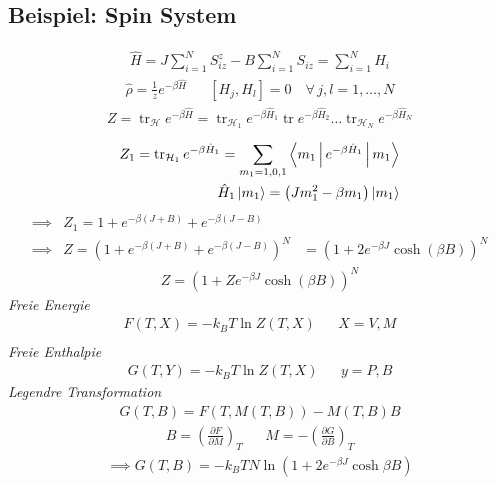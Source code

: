 \documentclass[11pt]{article}
\theoremstyle{plain}
\theoremstyle{mytheoremstyle}
\newcommand{\pd}[2]{\frac{\partial #1 }{\partial #2}}
\newcommand{\trace}{\operatorname{tr}}
\begin{document}
\subsection*{Beispiel: Spin System}
%
\begin{align*}
  \hat{H} = J \sum_{i=1}^{N} S_{iz}^z - B \sum_{i=1}^{N} S_{iz} 
  = \sum_{i=1}^{N} H_i
\end{align*}
%
%
\begin{align*}
  \hat{\rho} = \frac{1}{z} e^{-\beta \hat{H}}  &&
  \left[ H_j, H_l \right] = 0 \quad\forall\, j,l = 1,\dotsc,N
\end{align*}
%
%
\begin{align*}
  Z = \trace_\mathcal{H} e^{-\beta \hat{H}} = \trace_{\mathcal{H}_1} e ^{-\beta \hat{H}_1} \trace
  e^{-\beta \hat{H}_2} \ldots \trace_{\mathcal{H}_N} e^{-\beta \hat{H}_N}
\end{align*}
%
%
\begin{align*}
  Z_1 = \trace_{\mathcal{H}_1} e^{-\beta \hat{H}_1} = \sum_{m_1=1,0,1}^{}
  \Braket{m_1 | e^{-\beta \hat{H}_1} | m_1} \\ \hat{H}_1 \Ket{m_1} = 
  \left( J m_1^2 - \beta m_1 \right) \Ket{m_1}
\end{align*}
%
%
\begin{align*}
  \implies & Z_1 = 1 + e^{-\beta (J+B)} + e^{-\beta (J-B)} \\
  \implies & Z = \left( 1 + e^{-\beta (J+B)} + e^{-\beta(J-B)} \right)^N
  & = \left( 1+2 e^{-\beta J} \cosh(\beta B) \right)^N
\end{align*}
%
%
\begin{align*}
  Z = \left( 1 + Z e ^{-\beta J} \cosh(\beta B) \right)^N 
\end{align*}
\emph{Freie Energie}
%
\begin{align*}
  F(T, X) = - k_B T \ln{Z (T, X)} && X = V, M \\
\end{align*}
\emph{Freie Enthalpie} 
%
\begin{align*}
  G (T, Y) = -k_B T \ln{Z(T, X)} && y = P, B
\end{align*}
\emph{Legendre Transformation}
%
\begin{align*}
  G(T, B) = F (T, M(T, B)) - M(T,B) B
\end{align*}
%
\begin{align*}
  B = \left( \pd{F}{M} \right)_T && M = - \left( \pd{G}{B} \right)_T
\end{align*}
%
%
\begin{align*}
  \implies G(T,B) = -k_B T N \ln{\left( 1+ 2 e^{- \beta J} \cosh{\beta B} \right)}
\end{align*}
%
\end{document}
